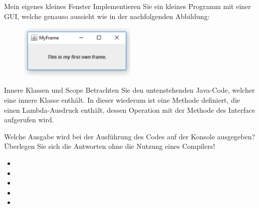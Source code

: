 \documentclass{../tuda-exercise}
\begin{document}
  \clearpagesolution

  \begin{task}[credit = \stars{1}{3}]{Mein eigenes kleines Fenster}
    Implementieren Sie ein kleines Programm mit einer GUI, welche genauso aussieht wie in der
    nachfolgenden Abbildung:

    \begin{figure}[h]
      \centering
      \includegraphics[width = 0.5\textwidth]{graphics/V3_Task.png}
    \end{figure}

    \begin{solution}
      
    \end{solution}
  \end{task}

  \clearpagesolution

  \begin{task}[credit = \stars{2}{3}]{Innere Klassen und Scope}
    Betrachten Sie den untenstehenden Java-Code, welcher eine innere Klasse
     enthält. In dieser wiederum ist eine Methode definiert, die einen
    Lambda-Ausdruck enthält, dessen Operation mit der Methode  des Interface
     aufgerufen wird.

    

    Welche Ausgabe wird bei der Ausführung des Codes auf der Konsole ausgegeben? Überlegen Sie
    sich die Antworten ohne die Nutzung eines Compilers!

    \begin{solution}
      \begin{itemize}
        \item {}
        \item {}
        \item {}
        \item {}
        \item {}
      \end{itemize}
    \end{solution}
  \end{task}
\end{document}
